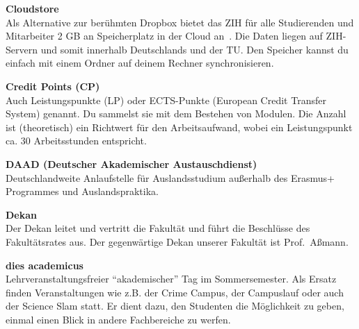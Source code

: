 \begin{multicols}{2}

\textbf{Cloudstore} \\
Als Alternative zur berühmten Dropbox bietet das ZIH für alle Studierenden und Mitarbeiter 2 GB an Speicherplatz in der Cloud an~.
Die Daten liegen auf ZIH-Servern und somit innerhalb Deutschlands und der TU\@.
Den Speicher kannst du einfach mit einem Ordner auf deinem Rechner synchronisieren.



\textbf{Credit Points (CP)} \\
Auch Leistungspunkte (LP) oder ECTS-Punkte (European Credit Transfer System) genannt. Du sammelst sie mit dem Bestehen von Modulen.
Die Anzahl ist (theoretisch) ein Richtwert für den Arbeitsaufwand, wobei ein Leistungspunkt ca. 30 Arbeitsstunden entspricht.

\textbf{DAAD (Deutscher Akademischer Austauschdienst)} \\
Deutschlandweite Anlaufstelle für Auslandsstudium außerhalb des Erasmus+ Programmes und Auslands\-praktika.

\textbf{Dekan} \\
Der Dekan leitet und vertritt die Fakultät und führt die Beschlüsse des Fakultätsrates aus.
Der gegenwärtige Dekan unserer Fakultät ist Prof.\ Aßmann.

\textbf{dies academicus} \\
Lehrveranstaltungsfreier \enquote {akademischer} Tag im Sommersemester.
Als Ersatz finden Veranstaltungen wie z.B. der Crime Campus, der Campuslauf oder auch der Science Slam statt.
Er dient dazu, den Studenten die Möglichkeit zu geben, einmal einen Blick in andere Fachbereiche zu werfen.~



\end{multicols}
